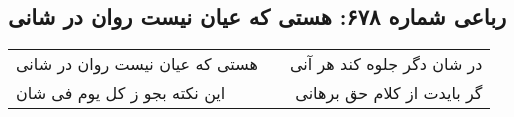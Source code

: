 \begin{center}
\section*{رباعی شماره ۶۷۸: هستی که عیان نیست روان در شانی}
\label{sec:sh678}
\begin{longtable}{l p{0.5cm} r}
هستی که عیان نیست روان در شانی
&&
در شان دگر جلوه کند هر آنی
\\
این نکته بجو ز کل یوم فی شان
&&
گر بایدت از کلام حق برهانی
\\
\end{longtable}
\end{center}
